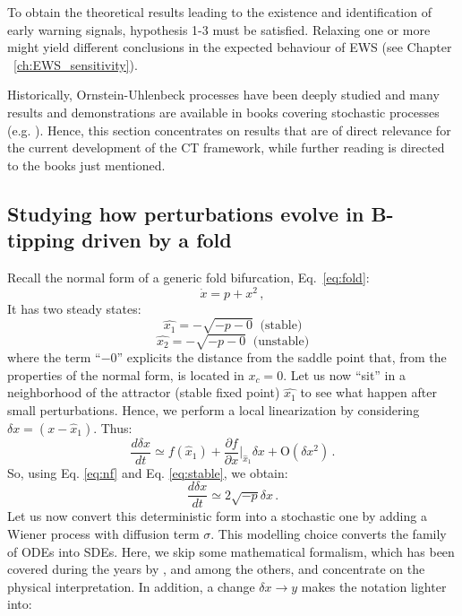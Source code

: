To obtain the theoretical results leading to the existence and identification of early warning signals, hypothesis 1-3 must be satisfied. Relaxing one or more might yield different conclusions in the expected behaviour of \gls{EWS} (see Chapter ~\ref{ch:EWS_sensitivity}). 

Historically, Ornstein-Uhlenbeck processes have been deeply studied and many results and demonstrations are available in books covering stochastic processes (e.g. \textcite{Allen2014,Gardiner1985,Berglund2006,Risken1991,papoulis2002probability}). Hence, this section concentrates on results that are of direct relevance for the current development of the \gls{CT} framework, while further reading is directed to the books just mentioned.

\tocless\subsection{Studying how perturbations evolve in B-tipping driven by a fold}
Recall the normal form of a generic fold bifurcation, Eq.~\ref{eq:fold}:
\begin{equation}
	\dot{x} = p+x^2 \, ,
	\label{eq:nf}
\end{equation}
It has two steady states:
\begin{equation}
	\hat{x_1} = -\sqrt{-p - 0} \; \; \text{(stable)}
	\label{eq:stable}
\end{equation}
\begin{equation} \label{eq:stability_fold}
	\hat{x_2} =-\sqrt{-p - 0} \; \; \text{(unstable)}
\end{equation}
where the term ``$-0$'' explicits the distance from the saddle point that, from the properties of the normal form, is located in $x_c = 0$. Let us now ``sit'' in a neighborhood of the attractor (stable fixed point) $\hat{x_1}$ to see what happen after small perturbations. Hence, we perform a local linearization by considering $\delta x = (x - \hat{x}_1)$. Thus:
\begin{equation}
	\frac{d \delta x}{dt} \simeq f(\hat{x}_1) + \frac{\partial f}{\partial x}|_{\hat{x}_1} \delta x + \mathrm{O}(\delta x^2) \, .
\end{equation}
So, using Eq. \ref{eq:nf} and Eq. \ref{eq:stable}, we obtain:
\begin{equation}
	\frac{d \delta x}{dt} \simeq 2 \sqrt{-p} \delta x \, .
\end{equation}
Let us now convert this deterministic form into a stochastic one by adding a Wiener process with diffusion term $\sigma$. This modelling choice converts the family of \gls{ODE}s into \gls{SDE}s. Here, we skip some mathematical formalism, which has been covered during the years by \textcite{khas1966limit}, \textcite{namachchivaya1990equivalence} and \textcite{Berglund2006} among the others, and concentrate on the physical interpretation. In addition, a change $\delta x \rightarrow y$ makes the notation lighter into:
